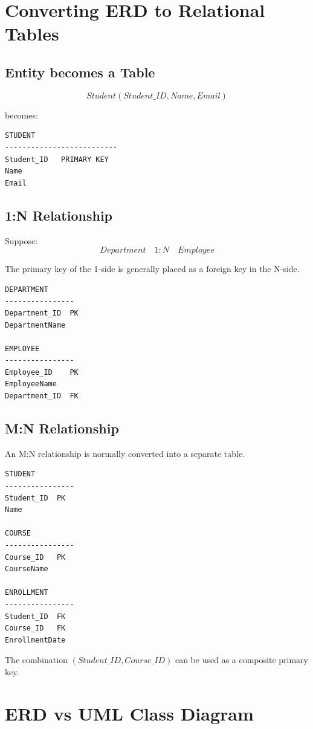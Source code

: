 \documentclass[12pt,a4paper]{article}
\begin{document}
\section{Converting ERD to Relational Tables}

\subsection{Entity becomes a Table}
\[
Student(Student\_ID, Name, Email)
\]

becomes:
\begin{verbatim}
STUDENT
--------------------------
Student_ID   PRIMARY KEY
Name
Email
\end{verbatim}

\subsection{1:N Relationship}
Suppose:
\[
Department \quad 1:N \quad Employee
\]

The primary key of the 1-side is generally placed as a foreign key in the N-side.

\begin{verbatim}
DEPARTMENT
----------------
Department_ID  PK
DepartmentName

EMPLOYEE
----------------
Employee_ID    PK
EmployeeName
Department_ID  FK
\end{verbatim}

\subsection{M:N Relationship}
An M:N relationship is normally converted into a separate table.

\begin{verbatim}
STUDENT
----------------
Student_ID  PK
Name

COURSE
----------------
Course_ID   PK
CourseName

ENROLLMENT
----------------
Student_ID  FK
Course_ID   FK
EnrollmentDate
\end{verbatim}

The combination $(Student\_ID, Course\_ID)$ can be used as a composite primary key.

\section{ERD vs UML Class Diagram}
\end{document}
